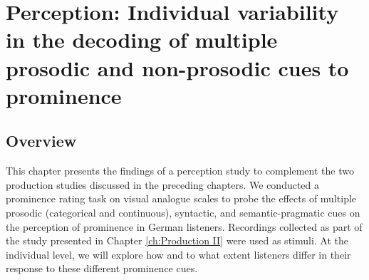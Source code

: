 \chapter{Perception: Individual variability in the decoding of multiple prosodic and non-prosodic cues to prominence}
\label{ch: Perception}

\section{Overview}

This chapter presents the findings of a perception study to complement the two production studies discussed in the preceding chapters. We conducted a prominence rating task on visual analogue scales to probe the effects of multiple prosodic (categorical and continuous), syntactic, and semantic-pragmatic cues on the perception of prominence in German listeners. Recordings collected as part of the study presented in Chapter \ref{ch:Production II} were used as stimuli. At the individual level, we will explore how and to what extent listeners differ in their response to these different prominence cues.

